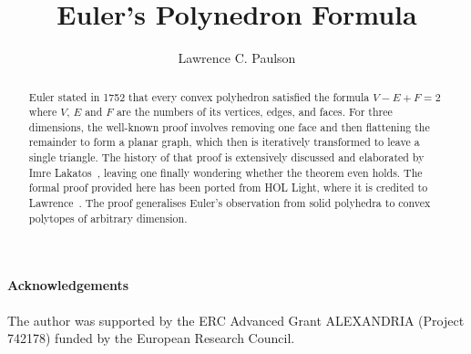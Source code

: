 \documentclass[11pt,a4paper]{article}
\begin{document}
\title{Euler's Polynedron Formula}
\author{Lawrence C. Paulson}
\maketitle

\begin{abstract}
Euler stated in 1752 that every convex polyhedron satisfied the formula $V - E + F = 2$ 
where $V$, $E$ and $F$ are the numbers of its vertices, edges, and faces. For three dimensions,
the well-known proof involves removing one face and then flattening the remainder to form a planar graph,
which then is iteratively transformed to leave a single triangle. The history of that proof is extensively
discussed and elaborated by Imre Lakatos~\cite{lakatos}, leaving one finally wondering whether
the theorem even holds. The formal proof provided here has been ported from HOL Light, 
where it is credited to Lawrence~\cite{lawrence-short}. The proof generalises Euler's observation
from solid polyhedra to convex polytopes of arbitrary dimension.
\end{abstract}

\newpage
\tableofcontents

\paragraph*{Acknowledgements}
The author was supported by the ERC Advanced Grant ALEXANDRIA (Project 742178) funded by the European Research Council. 

\newpage





\end{document}
